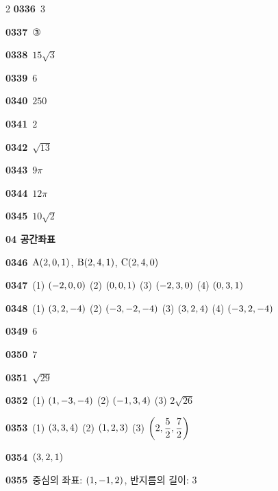 \documentclass[10pt,a4paper]{article}
\newcommand{\pt}[1]{\mathrm{#1}}
\begin{document}
\begin{multicols}{2}
\noindent\textbf{0336}\ $3$\par
\noindent\textbf{0337}\ ③\par
\noindent\textbf{0338}\ $15\sqrt{3}$\par
\noindent\textbf{0339}\ $6$\par
\noindent\textbf{0340}\ $250$\par
\noindent\textbf{0341}\ $2$\par
\noindent\textbf{0342}\ $\sqrt{13}$\par
\noindent\textbf{0343}\ $9\pi$\par
\noindent\textbf{0344}\ $12\pi$\par
\noindent\textbf{0345}\ $10\sqrt{2}$\par
\noindent\textbf{04 공간좌표}\par\smallskip
\noindent\textbf{0346}\ $\pt{A}(2{,}\mkern3mu\mathopen{}0{,}\mkern3mu\mathopen{}1)$, $\pt{B}(2{,}\mkern3mu\mathopen{}4{,}\mkern3mu\mathopen{}1)$, $\pt{C}(2{,}\mkern3mu\mathopen{}4{,}\mkern3mu\mathopen{}0)$\par
\noindent\textbf{0347}\ (1) $(-2{,}\mkern3mu\mathopen{}0{,}\mkern3mu\mathopen{}0)$ \quad (2) $(0{,}\mkern3mu\mathopen{}0{,}\mkern3mu\mathopen{}1)$ \quad (3) $(-2{,}\mkern3mu\mathopen{}3{,}\mkern3mu\mathopen{}0)$ \quad (4) $(0{,}\mkern3mu\mathopen{}3{,}\mkern3mu\mathopen{}1)$\par
\noindent\textbf{0348}\ (1) $(3{,}\mkern3mu\mathopen{}2{,}\mkern3mu\mathopen{}-4)$ \quad (2) $(-3{,}\mkern3mu\mathopen{}-2{,}\mkern3mu\mathopen{}-4)$ \quad (3) $(3{,}\mkern3mu\mathopen{}2{,}\mkern3mu\mathopen{}4)$ \quad (4) $(-3{,}\mkern3mu\mathopen{}2{,}\mkern3mu\mathopen{}-4)$\par
\noindent\textbf{0349}\ $6$\par
\noindent\textbf{0350}\ $7$\par
\noindent\textbf{0351}\ $\sqrt{29}$\par
\noindent\textbf{0352}\ (1) $(1{,}\mkern3mu\mathopen{}-3{,}\mkern3mu\mathopen{}-4)$ \quad (2) $(-1{,}\mkern3mu\mathopen{}3{,}\mkern3mu\mathopen{}4)$ \quad (3) $2\sqrt{26}$\par
\noindent\textbf{0353}\ (1) $(3{,}\mkern3mu\mathopen{}3{,}\mkern3mu\mathopen{}4)$ \quad (2) $(1{,}\mkern3mu\mathopen{}2{,}\mkern3mu\mathopen{}3)$ \quad (3) $\left(2{,}\mkern3mu\mathopen{}\dfrac{5}{2}{,}\mkern3mu\mathopen{}\dfrac{7}{2}\right)$\par
\noindent\textbf{0354}\ $(3{,}\mkern3mu\mathopen{}2{,}\mkern3mu\mathopen{}1)$\par
\noindent\textbf{0355}\ 중심의 좌표: $(1{,}\mkern3mu\mathopen{}-1{,}\mkern3mu\mathopen{}2)$, 반지름의 길이: $3$\par

\end{multicols}
\end{document}
